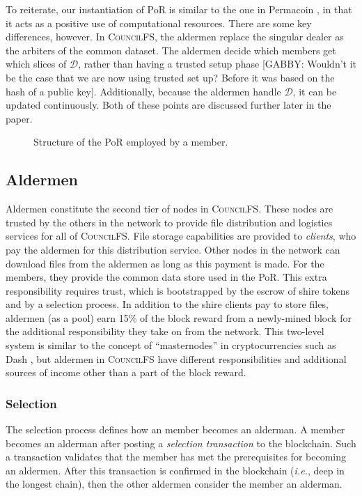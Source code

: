 \documentclass{article}
\begin{document}
To reiterate, our instantiation of PoR is similar to the one in Permacoin \cite{perma}, in
that it acts as a positive use of computational resources. There are some key
differences, however. In \textsc{CouncilFS}, the aldermen replace the singular dealer as
the arbiters of the common dataset. The aldermen decide which members get which
slices of $\mathcal{D}$, rather than having a trusted setup phase [GABBY: Wouldn't it be the case that we are now using trusted set up? Before it was based on the hash of a public key]. Additionally,
because the aldermen handle $\mathcal{D}$, it can be updated continuously. Both
of these points are discussed further later in the paper.

\begin{figure}[t]
  \centering
  \fbox{\rule[-.5cm]{4cm}{4cm} \rule[-.5cm]{4cm}{0cm}}
  \caption{Structure of the PoR employed by a member.}
  \label{fig:por-member}
\end{figure}

\subsection{Aldermen}

Aldermen constitute the second tier of nodes in \textsc{CouncilFS}. These nodes
are trusted by the others in the network to provide file distribution and
logistics services for all of \textsc{CouncilFS}. File storage capabilities are
provided to \emph{clients}, who pay the aldermen for this distribution service.
Other nodes in the network can download files from the aldermen as long as this
payment is made. For the members, they provide the common data store used in the
PoR. This extra responsibility requires trust, which is bootstrapped by the
escrow of shire tokens and by a selection process. In addition to the shire
clients pay to store files, aldermen (as a pool) earn 15\% of the block reward
from a newly-mined block for the additional responsibility they take on from the
network. This two-level system is similar to the concept of ``masternodes'' in
cryptocurrencies such as Dash \cite{dash-coin}, but aldermen in
\textsc{CouncilFS} have different responsibilities and additional sources of
income other than a part of the block reward.

\subsubsection{Selection}

The selection process defines how an member becomes an alderman. A member
becomes an alderman after posting a \emph{selection transaction} to the
blockchain. Such a transaction validates that the member has met the
prerequisites for becoming an aldermen. After this transaction is confirmed in
the blockchain (\emph{i.e.}, deep in the longest chain), then the other aldermen
consider the member an alderman.
\end{document}
